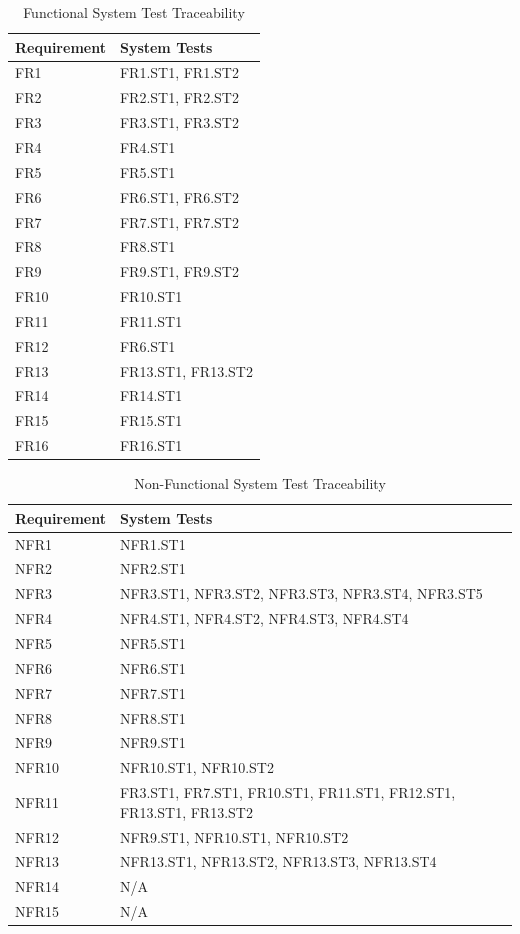 \documentclass[12pt, titlepage]{article}
\begin{document}
\begin{longtable}{|p{} | p{}|}
  \caption{Functional System Test Traceability}
  \label{TblFRSTTraceability}\\
  \hline
  \textbf{Requirement} & \textbf{System Tests}\\
  \hline
  FR1 & FR1.ST1, FR1.ST2\\
  \hline
  FR2 & FR2.ST1, FR2.ST2\\
  \hline
  FR3 & FR3.ST1, FR3.ST2\\
  \hline
  FR4 & FR4.ST1\\
  \hline
  FR5 & FR5.ST1\\
  \hline
  FR6 & FR6.ST1, FR6.ST2\\
  \hline
  FR7 & FR7.ST1, FR7.ST2\\
  \hline
  FR8 & FR8.ST1\\
  \hline
  FR9 & FR9.ST1, FR9.ST2\\
  \hline
  FR10 & FR10.ST1\\
  \hline
  FR11 & FR11.ST1\\
  \hline
  FR12 & FR6.ST1\\
  \hline
  FR13 & FR13.ST1, FR13.ST2\\
  \hline
  FR14 & FR14.ST1\\
  \hline
  FR15 & FR15.ST1\\
  \hline
  FR16 & FR16.ST1\\
  \hline
\end{longtable}

\begin{longtable}{|p{} | p{}|}
  \caption{Non-Functional System Test Traceability}
  \label{TblNFRSTTraceability}\\
  \hline
  \textbf{Requirement} & \textbf{System Tests}\\
  \hline
  NFR1 & NFR1.ST1\\
  \hline
  NFR2 & NFR2.ST1\\
  \hline
  NFR3 & NFR3.ST1, NFR3.ST2, NFR3.ST3, NFR3.ST4, NFR3.ST5\\
  \hline
  NFR4 & NFR4.ST1, NFR4.ST2, NFR4.ST3, NFR4.ST4\\
  \hline
  NFR5 & NFR5.ST1\\
  \hline
  NFR6 & NFR6.ST1\\
  \hline
  NFR7 & NFR7.ST1\\
  \hline
  NFR8 & NFR8.ST1\\
  \hline
  NFR9 & NFR9.ST1\\
  \hline
  NFR10 & NFR10.ST1, NFR10.ST2\\
  \hline
  NFR11 & FR3.ST1, FR7.ST1, FR10.ST1, FR11.ST1, FR12.ST1, FR13.ST1, FR13.ST2\\
  \hline
  NFR12 & NFR9.ST1, NFR10.ST1, NFR10.ST2\\
  \hline
  NFR13 & NFR13.ST1, NFR13.ST2, NFR13.ST3, NFR13.ST4\\
  \hline
  NFR14 & N/A\\
  \hline
  NFR15 & N/A\\
  \hline
\end{longtable}
\end{document}
